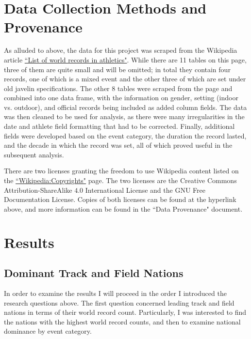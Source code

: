 \documentclass{article}
\begin{document}
\section{Data Collection Methods and Provenance}

As alluded to above, the data for this project was scraped from the Wikipedia article 
\href{https://en.wikipedia.org/wiki/List_of_world_records_in_athletics}{``List of world records in athletics"}.  
While there are 11 tables on this page, three of them are quite small and will be omitted; in total they contain 
four records, one of which is a mixed event and the other three of which are set under old javelin specifications.  
The other $8$ tables were scraped from the page and combined into one data frame, with the information on gender, 
setting (indoor vs. outdoor), and official records being included as added column fields.  The data was then 
cleaned to be used for analysis, as there were many irregularities in the date and athlete field formatting that 
had to be corrected.  Finally, additional fields were developed based on the event category, the duration the 
record lasted, and the decade in which the record was set, all of which proved useful in the subsequent analysis.

There are two licenses granting the  freedom to use Wikipedia content listed on the 
\href{https://en.wikipedia.org/wiki/Wikipedia:Copyrights}{``Wikipedia:Copyrights"} page.  The two licenses are 
the Creative Commons Attribution-ShareAlike $4.0$ International License and the GNU Free Documentation License.  
Copies of both licenses can be found at the hyperlink above, and more information can be found in the ``Data 
Provenance" document.

\section{Results}

\subsection{Dominant Track and Field Nations}

In order to examine the results I will proceed in the order I introduced the research questions above.  The first 
question concerned leading track and field nations in terms of their world record count.  Particularly, I was 
interested to find the nations with the highest world record counts, and then to examine national dominance by 
event category.  
\end{document}
